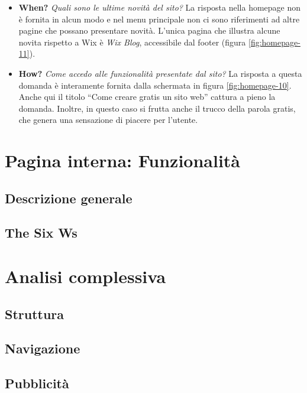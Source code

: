 \documentclass[11pt,a4paper]{article}
\newcommand*{\wix}{Wix}
\begin{document}
\begin{itemize}
  \item \textbf{When?} \textit{Quali sono le ultime novità del sito?}
    La risposta nella homepage non è fornita in alcun modo e nel menu
    principale non ci sono riferimenti ad altre pagine che possano
    presentare novità. L'unica pagina che illustra alcune novita
    rispetto a \wix{} è \textit{Wix Blog}, accessibile dal footer
    (figura \ref{fig:homepage-11}).

  \item \textbf{How?} \textit{Come accedo alle funzionalità presentate
    dal sito?} La risposta a questa domanda è interamente fornita
    dalla schermata in figura \ref{fig:homepage-10}. Anche qui il
    titolo ``Come creare gratis un sito web'' cattura a pieno la
    domanda. Inoltre, in questo caso si frutta anche il trucco della
    parola gratis, che genera una sensazione di piacere per l'utente.  
\end{itemize}

\section{Pagina interna: Funzionalità}
\label{sec:secondary-page-analysis}

\subsection{Descrizione generale}
\label{subsec:internalpage-description}

\subsection{The Six Ws}
\label{subsec:internalpage-the-six-ws}

\section{Analisi complessiva}
\label{sec:full-analysis}

\subsection{Struttura}
\label{subsec:structure}

\subsection{Navigazione}
\label{subsec:navigation}

\subsection{Pubblicità}
\label{subsec:ads}
\end{document}
